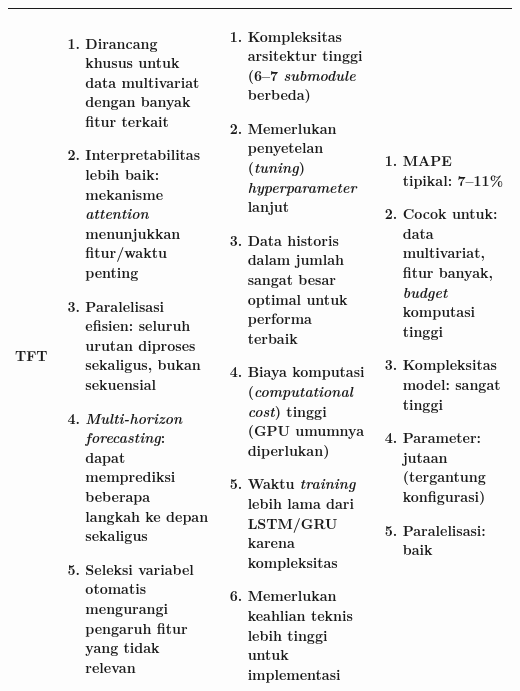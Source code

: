 \begin{longtable}{|p{1.8cm}|p{3.5cm}|p{3.8cm}|p{3cm}|}
\textbf{TFT} &
\begin{enumerate}[leftmargin=*,itemsep=0.5pt,topsep=1pt,partopsep=0pt]
  \item Dirancang khusus untuk data multivariat dengan banyak fitur terkait
  \item Interpretabilitas lebih baik: mekanisme \textit{attention} menunjukkan fitur/waktu penting
  \item Paralelisasi efisien: seluruh urutan diproses sekaligus, bukan sekuensial
  \item \textit{Multi-horizon forecasting}: dapat memprediksi beberapa langkah ke depan sekaligus
  \item Seleksi variabel otomatis mengurangi pengaruh fitur yang tidak relevan
\end{enumerate}
&
\begin{enumerate}[leftmargin=*,itemsep=0.5pt,topsep=1pt,partopsep=0pt]
  \item Kompleksitas arsitektur tinggi (6--7 \textit{submodule} berbeda)
  \item Memerlukan penyetelan (\textit{tuning}) \textit{hyperparameter} lanjut
  \item Data historis dalam jumlah sangat besar optimal untuk performa terbaik
  \item Biaya komputasi (\textit{computational cost}) tinggi (GPU umumnya diperlukan)
  \item Waktu \textit{training} lebih lama dari LSTM/GRU karena kompleksitas
  \item Memerlukan keahlian teknis lebih tinggi untuk implementasi
\end{enumerate}
&
\begin{enumerate}[leftmargin=*,itemsep=0.5pt,topsep=1pt,partopsep=0pt]
  \item MAPE tipikal: 7--11\%
  \item Cocok untuk: data multivariat, fitur banyak, \textit{budget} komputasi tinggi
  \item Kompleksitas model: sangat tinggi
  \item Parameter: jutaan (tergantung konfigurasi)
  \item Paralelisasi: baik
\end{enumerate}
\tabularnewline
\hline


\end{longtable}
